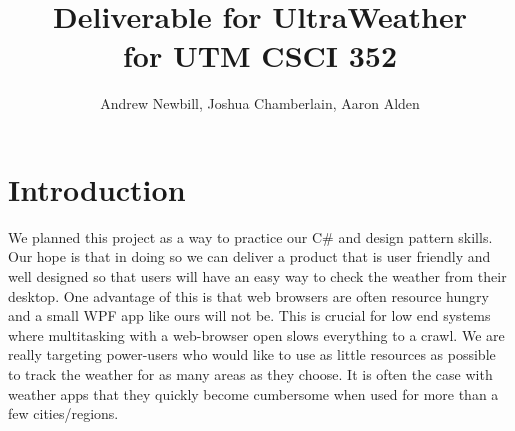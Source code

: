 \documentclass[10pt,conference,onecolumn,compsoc]{IEEEtran}
\begin{document}
\title{Deliverable for UltraWeather\\ for UTM CSCI 352}
%
%


\author{Andrew Newbill, Joshua Chamberlain, Aaron Alden\\ %
}



\maketitle



\IEEEdisplaynontitleabstractindextext

\IEEEpeerreviewmaketitle



\section{Introduction}
\quad We planned this project as a way to practice our C\# and design pattern skills. Our hope is that in doing so we can deliver a product that is user friendly and well designed so that users will have an easy way to check the weather from their desktop. One advantage of this is that web browsers are often resource hungry and a small WPF app like ours will not be. This is crucial for low end systems where multitasking with a web-browser open slows everything to a crawl. We are really targeting power-users who would like to use as little resources as possible to track the weather for as many areas as they choose. It is often the case with weather apps that they quickly become cumbersome when used for more than a few cities/regions.
\end{document}
